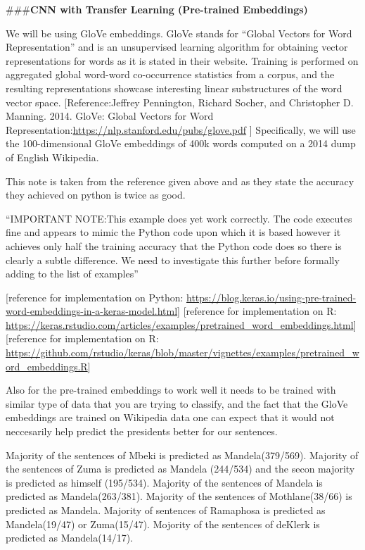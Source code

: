 \documentclass[]{article}
\begin{document}
\#\#\#\textbf{CNN with Transfer Learning \n(Pre-trained Embeddings)}

We will be using GloVe embeddings. GloVe stands for ``Global Vectors for
Word Representation'' and is an unsupervised learning algorithm for
obtaining vector representations for words as it is stated in their
website. Training is performed on aggregated global word-word
co-occurrence statistics from a corpus, and the resulting
representations showcase interesting linear substructures of the word
vector space. {[}Reference:Jeffrey Pennington, Richard Socher, and
Christopher D. Manning. 2014. GloVe: Global Vectors for Word
Representation:\url{https://nlp.stanford.edu/pubs/glove.pdf} {]}
Specifically, we will use the 100-dimensional GloVe embeddings of 400k
words computed on a 2014 dump of English Wikipedia.

This note is taken from the reference given above and as they state the
accuracy they achieved on python is twice as good.

``IMPORTANT NOTE:This example does yet work correctly. The code executes
fine and appears to mimic the Python code upon which it is based however
it achieves only half the training accuracy that the Python code does so
there is clearly a subtle difference. We need to investigate this
further before formally adding to the list of examples''

{[}reference for implementation on Python:
\url{https://blog.keras.io/using-pre-trained-word-embeddings-in-a-keras-model.html}{]}
{[}reference for implementation on R:
\url{https://keras.rstudio.com/articles/examples/pretrained_word_embeddings.html}{]}
{[}reference for implementation on R:
\url{https://github.com/rstudio/keras/blob/master/vignettes/examples/pretrained_word_embeddings.R}{]}

Also for the pre-trained embeddings to work well it needs to be trained
with similar type of data that you are trying to classify, and the fact
that the GloVe embeddings are trained on Wikipedia data one can expect
that it would not neccesarily help predict the presidents better for our
sentences.

Majority of the sentences of Mbeki is predicted as Mandela(379/569).
Majority of the sentences of Zuma is predicted as Mandela (244/534) and
the secon majority is predicted as himself (195/534). Majority of the
sentences of Mandela is predicted as Mandela(263/381). Majority of the
sentences of Mothlane(38/66) is predicted as Mandela. Majority of
sentences of Ramaphosa is predicted as Mandela(19/47) or Zuma(15/47).
Mojority of the sentences of deKlerk is predicted as Mandela(14/17).
\end{document}
